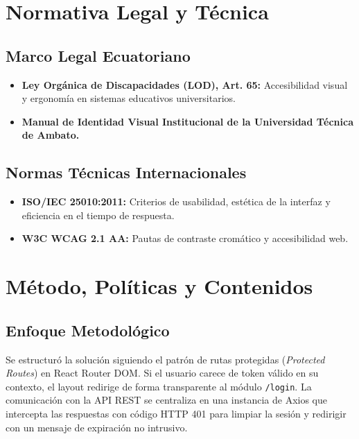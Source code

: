 \documentclass[12pt,a4paper]{article}
\begin{document}
\section{Normativa Legal y Técnica}
\subsection{Marco Legal Ecuatoriano}
\begin{itemize}[leftmargin=1.5em, itemsep=2pt]
    \item \textbf{Ley Orgánica de Discapacidades (LOD), Art. 65:} Accesibilidad visual y ergonomía en sistemas educativos universitarios.
    \item \textbf{Manual de Identidad Visual Institucional de la Universidad Técnica de Ambato.}
\end{itemize}
\subsection{Normas Técnicas Internacionales}
\begin{itemize}[leftmargin=1.5em, itemsep=2pt]
    \item \textbf{ISO/IEC 25010:2011:} Criterios de usabilidad, estética de la interfaz y eficiencia en el tiempo de respuesta.
    \item \textbf{W3C WCAG 2.1 AA:} Pautas de contraste cromático y accesibilidad web.
\end{itemize}

\section{Método, Políticas y Contenidos}
\subsection{Enfoque Metodológico}
Se estructuró la solución siguiendo el patrón de rutas protegidas (\textit{Protected Routes}) en React Router DOM. Si el usuario carece de token válido en su contexto, el layout redirige de forma transparente al módulo \texttt{/\allowbreak  login}. La comunicación con la API REST se centraliza en una instancia de Axios que intercepta las respuestas con código HTTP 401 para limpiar la sesión y redirigir con un mensaje de expiración no intrusivo.
\end{document}

